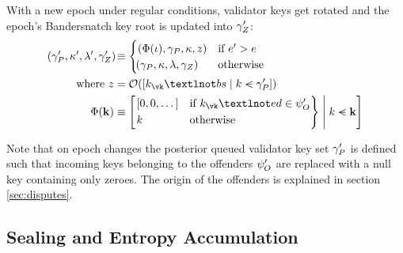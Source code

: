 With a new epoch under regular conditions, validator keys get rotated and the epoch's Bandersnatch key root is updated into $\gamma_Z'$:
\begin{align}
  \tup{\pendingset', \activeset', \previousset', \epochroot'} &\equiv \begin{cases}
    (\Phi(\stagingset), \pendingset, \activeset, z) &\when e' > e \\ \tup{\pendingset, \activeset, \previousset, \epochroot} &\otherwise
  \end{cases} \\
  \nonumber \where z &= \getringroot{\sq{\build{k_\vk¬bs}{k \orderedin \pendingset'}}} \\
  \label{eq:blacklistfilter} \Phi(\mathbf{k}) &\equiv \sq{
    \build{
      \begin{rcases}
        \sq{0, 0, \dots} &\when \vkX_\vk¬ed \in \offenders' \\
        \vkX &\otherwise
      \end{rcases}
    }{
      \vkX \orderedin \mathbf{k}
    }
  }
\end{align}

Note that on epoch changes the posterior queued validator key set $\gamma_P'$ is defined such that incoming keys belonging to the offenders $\psi_O'$ are replaced with a null key containing only zeroes. The origin of the offenders is explained in section \ref{sec:disputes}.







\subsection{Sealing and Entropy Accumulation}
\label{sec:sealandentropy}

